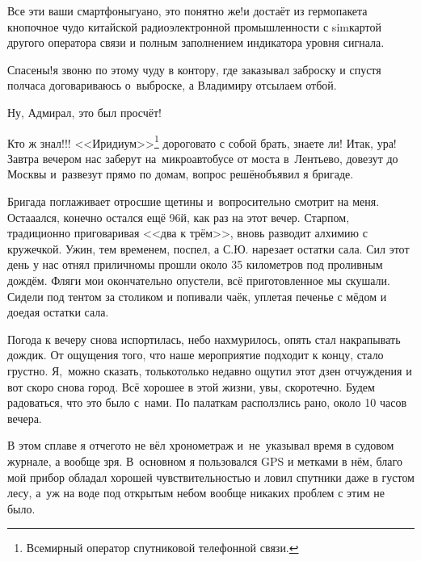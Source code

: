 \diagdash Все эти ваши смартфоны\mdash гуано, это понятно же!\mdash и достаёт из гермопакета кнопочное чудо китайской радиоэлектронной промышленности с sim\sdash картой другого оператора связи и полным заполнением индикатора уровня сигнала.

\diagdash Спасены!\mdash я звоню по этому чуду в контору, где заказывал заброску и спустя полчаса договариваюсь о~выброске, а Владимиру отсылаем отбой. 

\diagdash Ну, Адмирал, это был просчёт! 

\diagdash Кто ж знал!!! <<Иридиум>>\footnote[1]{Всемирный оператор спутниковой телефонной связи.} дороговато с собой брать, знаете ли! Итак, ура! Завтра вечером нас заберут на~микроавтобусе от моста в~Лентьево, довезут до Москвы и~развезут прямо по домам, вопрос решён\mdash объявил я бригаде.

Бригада поглаживает отросшие щетины и~вопросительно смотрит на меня. Оста\sdash а\sdash ался, конечно остался ещё 96\sdash й, как раз на этот вечер. Старпом, традиционно приговаривая <<два к трём>>, вновь разводит алхимию с кружечкой. Ужин, тем временем, поспел, а С.Ю. нарезает остатки сала. Сил этот день у нас отнял прилично\mdash мы прошли около 35 километров под проливным дождём. Фляги мои окончательно опустели, всё приготовленное мы скушали. Сидели под тентом за столиком и попивали чаёк, уплетая печенье с мёдом и доедая остатки сала. 

Погода к вечеру снова испортилась, небо нахмурилось, опять стал накрапывать дождик. От ощущения того, что наше мероприятие подходит к концу, стало грустно. Я,~можно сказать, только\sdash только недавно ощутил этот дзен отчуждения и вот скоро снова город. Всё хорошее в этой жизни, увы, скоротечно. Будем радоваться, что это было с~нами. По палаткам расползлись рано, около 10 часов вечера. 

В этом сплаве я отчего\sdash то не вёл хронометраж и~не~указывал время в судовом журнале, а вообще зря. В~основном я пользовался GPS и метками в нём, благо мой прибор обладал хорошей чувствительностью и ловил спутники даже в густом лесу, а~уж на воде под открытым небом вообще никаких проблем с этим не было.

\begin{center}
\end{center}
